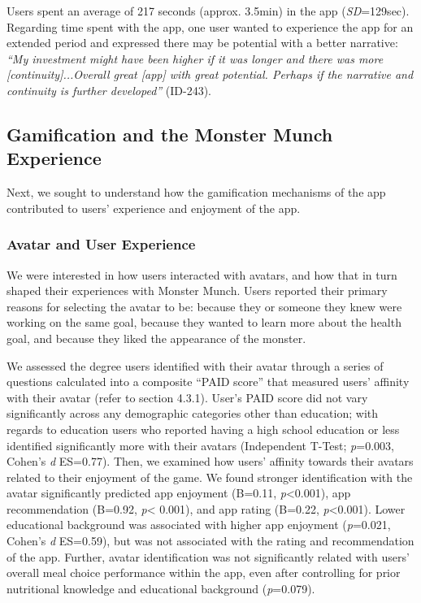 Users spent an average of 217 seconds (approx. 3.5min) in the app (\textit{SD}=129sec). Regarding time spent with the app, one user wanted to experience the app for an extended period and expressed there may be potential with a better narrative: \textit{``My investment might have been higher if it was longer and there was more [continuity]...Overall great [app] with great potential. Perhaps if the narrative and continuity is further developed''} (ID-243). %
\vspace{-5pt}
\subsection{Gamification and the Monster Munch Experience}
Next, we sought to understand how the gamification mechanisms of the app contributed to users' experience and enjoyment of the app. 
\vspace{-5pt}
\subsubsection {Avatar and User Experience}
We were interested in how users interacted with avatars, and how that in turn shaped their experiences with Monster Munch. Users reported their primary reasons for selecting the avatar to be: because they or someone they knew were working on the same goal, because they wanted to learn more about the health goal, and because they liked the appearance of the monster.

We assessed the degree users identified with their avatar through a series of questions calculated into a composite ``PAID score'' that measured users' affinity with their avatar (refer to section 4.3.1). 
User's PAID score did not vary significantly across any demographic categories other than education; with regards to education users who reported having a high school education or less identified significantly more with their avatars (Independent T-Test; \textit{p}=0.003, Cohen's \textit{d} ES=0.77). 
Then, we examined  how users' affinity towards their avatars related to their enjoyment of the game. We found stronger identification with the avatar significantly predicted app enjoyment (B=0.11, \textit{p}<0.001), app recommendation (B=0.92, \textit{p}< 0.001), and app rating (B=0.22, \textit{p}<0.001).
Lower educational background was associated with higher app enjoyment (\textit{p}=0.021, Cohen's \textit{d} ES=0.59), but was not associated with the rating and recommendation of the app.
Further, avatar identification was not significantly related with users' overall meal choice performance within the app, even after controlling for prior nutritional knowledge and educational background (\textit{p}=0.079). 

